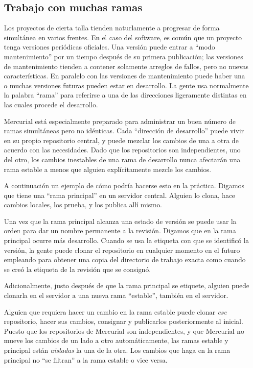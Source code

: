 \subsection{Trabajo con muchas ramas}

Los proyectos de cierta talla tienden naturlamente a progresar de
forma simultánea en varios frentes. En el caso del software, es común
que un proyecto tenga versiones periódicas oficiales. Una versión
puede entrar a ``modo mantenimiento'' por un tiempo después de su
primera publicación; las versiones de mantenimiento tienden a contener
solamente arreglos de fallos, pero no nuevas características. En
paralelo con las versiones de mantenimiento puede haber una o muchas
versiones futuras pueden estar en desarrollo. La gente usa normalmente
la palabra ``rama'' para referirse a una de las direcciones
ligeramente distintas en las cuales procede el desarrollo.

Mercurial está especialmente preparado para administrar un buen número
de ramas simultáneas pero no idénticas. Cada ``dirección de
desarrollo'' puede vivir en su propio repositorio central, y puede
mezclar los cambios de una a otra de acuerdo con las necesidades. Dado
que los repositorios son independientes, uno del otro, los cambios
inestables de una rama de desarrollo nunca afectarán una rama estable
a menos que alguien explícitamente mezcle los cambios.

A continuación un ejemplo de cómo podría hacerse esto en la
práctica. Digamos que tiene una ``rama principal'' en un servidor
central.
Alguien lo clona, hace cambios locales, los prueba, y los publica allí
mismo.

Una vez que la rama principal alcanza una estado de versión se puede
usar la orden  para dar un nombre permanente a la revisión.
Digamos que en la rama principal ocurre más desarrollo.
Cuando se usa la etiqueta con que se identificó la versión, la gente
puede clonar el repositorio en cualquier momento en el futuro
empleando  para obtener una copia del directorio de
trabajo exacta como cuando se creó la etiqueta de la revisión que se
consignó.

Adicionalmente, justo después de que la rama principal se etiquete,
alguien puede clonarla en el servidor a una nueva rama ``estable'',
también en el servidor.

Alguien que requiera hacer un cambio en la rama estable puede clonar
\emph{ese} repositorio, hacer sus cambios, consignar y publicarlos
posteriormente al inicial.
Puesto que los repositorios de Mercurial son independientes, y que
Mercurial no mueve los cambios de un lado a otro automáticamente, las
ramas estable y principal están \emph{aisladas} la una de la otra.
Los cambios que haga en la rama principal no ``se filtran'' a la rama
estable o vice versa.

